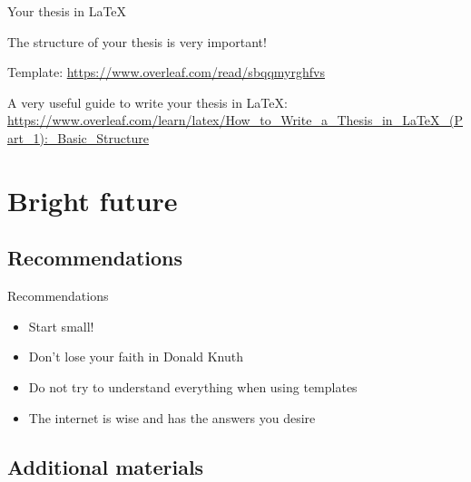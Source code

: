 \documentclass[inputenc]{beamer}
\begin{document}
\begin{frame}{Your thesis in \LaTeX{}}
    
    The structure of your thesis is very important!
    
    \vspace{1cm}
    Template:
    \url{https://www.overleaf.com/read/sbqqmyrghfvs}
    
    \vspace{1cm}
    A very useful guide to write your thesis in \LaTeX{}: 
    \url{https://www.overleaf.com/learn/latex/How_to_Write\_a\_Thesis\_in\_LaTeX\_(Part\_1):\_Basic\_Structure}
    
\end{frame}

\section{Bright future}

\subsection{Recommendations}

\begin{frame}{Recommendations}

    \begin{itemize}
        \item Start small!
        \item Don't lose your faith in Donald Knuth
        \item Do not try to understand everything when using templates
        \item The internet is wise and has the answers you desire
    \end{itemize}
    
\end{frame}

\subsection{Additional materials}
\end{document}
